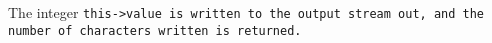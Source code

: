 The integer \tt{this->value} is written to the output stream
\tt{out}, and the number of characters written is returned.
